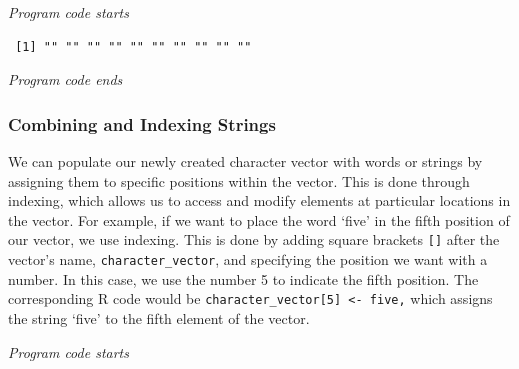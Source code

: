 \emph{Program code starts}

\begin{Shaded}
\begin{Highlighting}[]
\OtherTok{\textless{}{-}} \NormalTok{(}\NormalTok{)}

\end{Highlighting}
\end{Shaded}

\begin{verbatim}
 [1] "" "" "" "" "" "" "" "" "" ""
\end{verbatim}

\emph{Program code ends}

\subsubsection{Combining and Indexing
Strings}\label{combining-and-indexing-strings}

We can populate our newly created character vector with words or strings
by assigning them to specific positions within the vector. This is done
through indexing, which allows us to access and modify elements at
particular locations in the vector. For example, if we want to place the
word `five' in the fifth position of our vector, we use indexing. This is done by adding square brackets \texttt{{[}{]}} after
the vector's name, \texttt{character\_vector}, and specifying the position we want with a number. In this case, we use the number 5 to
indicate the fifth position. The corresponding R code would be
\texttt{character\_vector{[}5{]}\ \textless{}-\ \textquotesingle{}five,\textquotesingle{}}
which assigns the string `five' to the fifth element of the vector.

\emph{Program code starts}

\begin{Shaded}
\begin{Highlighting}[]
\NormalTok{character\_vector[}\NormalTok{] }\OtherTok{\textless{}{-}} 

\end{Highlighting}
\end{Shaded}

